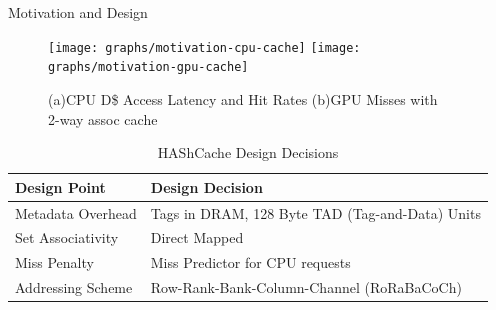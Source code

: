 \documentclass[final,t]{beamer}
\begin{document}
\begin{frame}[t,fragile]{}
\begin{columns}[t]
\begin{column}{.48\linewidth}
\begin{tcolorbox}[colback=red!5!white,
                  colframe=red!75!black,
                 ]
\begin{exampleblock}{Motivation and Design}
    \begin{figure}
       \texttt{[image: graphs/motivation-cpu-cache]}
       \texttt{[image: graphs/motivation-gpu-cache]}
       \caption{(a)CPU D\$ Access Latency and Hit Rates (b)GPU Misses with 2-way assoc cache}
       \label{fig:motivation-cpu-cache}
    \end{figure}  

\vspace{1em}
\begin{table}[]
\centering
\begin{tabular}{ll}
\textbf{Design Point}                   & \textbf{Design Decision}          \\
\hline
Metadata Overhead & Tags in DRAM, 128 Byte TAD (Tag-and-Data) Units        \\
Set Associativity                                           & Direct Mapped                                          \\
Miss Penalty                                                & Miss Predictor for CPU requests                        \\
Addressing Scheme                                           & Row-Rank-Bank-Column-Channel (RoRaBaCoCh)
\end{tabular}
\caption{HAShCache Design Decisions}
\end{table}
    \end{exampleblock}
     







\end{tcolorbox}
\end{column}


\begin{column}{.48\linewidth}
\begin{tcolorbox}[
                  title={\vspace{0.7em} \large \ HAShCache \ = \ \textit{PrIS} \ + \ \textit{ByE} \ + \ \textit{Chaining} \vspace{0.4em}
                         },
                  colback=red!5!white,
                  colframe=red!75!black,
                  coltitle=red!25!black,
                  colbacktitle=yellow!50!red,	
                  fonttitle=\bfseries,
                 ]


\end{tcolorbox}
\end{column}
\end{columns}
\end{frame}
\end{document}
